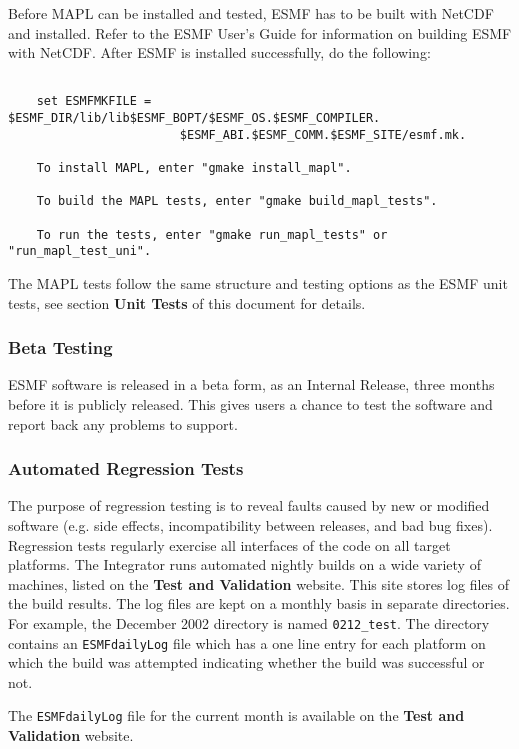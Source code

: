 Before MAPL can be installed and tested, ESMF has to be built with NetCDF and installed.
Refer to the ESMF User's Guide for information on building
ESMF with NetCDF. After ESMF is installed successfully, do the following:
\begin{verbatim}

	set ESMFMKFILE = $ESMF_DIR/lib/lib$ESMF_BOPT/$ESMF_OS.$ESMF_COMPILER.
                        $ESMF_ABI.$ESMF_COMM.$ESMF_SITE/esmf.mk.

	To install MAPL, enter "gmake install_mapl".

	To build the MAPL tests, enter "gmake build_mapl_tests".

	To run the tests, enter "gmake run_mapl_tests" or "run_mapl_test_uni".

\end{verbatim}

The MAPL tests follow the same structure and testing options as
the ESMF unit tests, see section {\bf Unit Tests} of this document for details.

\subsubsection{Beta Testing}

ESMF software is released in a beta form, as an Internal Release,
three months before it is publicly released.  This gives users
a chance to test the software and report back any problems to 
support.

\subsubsection{Automated Regression Tests}

The purpose of regression testing is to reveal faults caused by new
or modified software (e.g. side effects, incompatibility between 
releases, and bad bug fixes).  
Regression tests regularly exercise all interfaces of the code on 
all target platforms.  The Integrator runs 
automated nightly builds on a wide variety of machines, listed on the
{\bf Test and Validation} website. This site stores log files of the
build results.
The log files are kept on a monthly basis in 
separate directories. For example, the December 2002 directory is named {\tt 0212\_test}. The 
directory contains an {\tt ESMFdailyLog} file which has a one line entry for each platform on 
which the build was attempted indicating whether the build was successful or not. 

The {\tt ESMFdailyLog} file for the current month is available on the {\bf Test and Validation} website.

